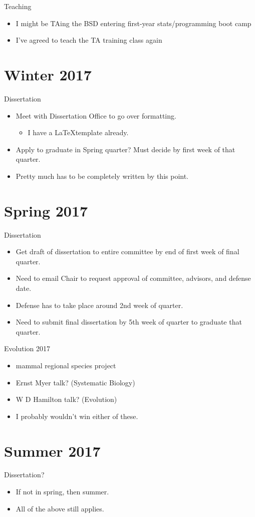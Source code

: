 \documentclass{article}
\begin{document}
Teaching
\begin{itemize}
  \item I might be TAing the BSD entering first-year stats/programming boot camp
  \item I've agreed to teach the TA training class again
\end{itemize}


\section{Winter 2017}
Dissertation
\begin{itemize}
  \item Meet with Dissertation Office to go over formatting. 
    \begin{itemize}
      \item I have a \LaTeX template already.
    \end{itemize}
  \item Apply to graduate in Spring quarter? Must decide by first week of that quarter.
  \item Pretty much has to be completely written by this point.
\end{itemize}


\section{Spring 2017}
Dissertation
\begin{itemize}
  \item Get draft of dissertation to entire committee by end of first week of final quarter.
  \item Need to email Chair to request approval of committee, advisors, and defense date.
  \item Defense has to take place around 2nd week of quarter.
  \item Need to submit final dissertation by 5th week of quarter to graduate that quarter.
\end{itemize}

Evolution 2017
\begin{itemize}
  \item mammal regional species project
  \item Ernst Myer talk? (Systematic Biology)
  \item W D Hamilton talk? (Evolution)
  \item I probably wouldn't win either of these.
\end{itemize}


\section{Summer 2017}
Dissertation?
\begin{itemize}
  \item If not in spring, then summer.
  \item All of the above still applies.
\end{itemize}
\end{document}
